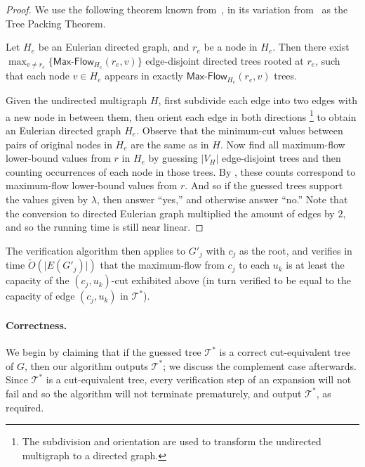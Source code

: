 \documentclass{toc}
\theoremstyle{plain}
\newcommand{\ProblemName}[1]{\textsf{#1}}
\newcommand{\MF}{\ProblemName{Max-Flow}\xspace}
\newcommand\tO{\ensuremath{\widetilde O}}  %
\newcommand{\TG}{\mathcal{T}^*}
\providecommand{\card}[1]{\lvert#1\rvert}
\begin{document}
\begin{proof}
We use the following theorem known from~\cite[Theorem $2.7$]{Bang-Jensen95},
in its variation from~\cite{Cole03} as the Tree Packing Theorem.

\begin{theorem}\label{theorem:BHKP}
Let $H_e$ be an Eulerian directed graph, and $r_e$ be a node in $H_e$.
Then there exist $\max_{v\neq r_e}\{\MF_{H_e}(r_e,v)\}$ edge-disjoint directed trees rooted at $r_e$, such that each node $v\in H_e$ appears in exactly $\MF_{H_e}(r_e,v)$ trees.
\end{theorem}

Given the undirected multigraph $H$, first subdivide each edge into two edges with a new node in between them,
then orient each edge in both directions%
\footnote{The subdivision and orientation are used to transform
  the undirected multigraph to a directed graph.
}
to obtain an Eulerian directed graph $H_e$.
Observe that the minimum-cut values between pairs of original nodes in $H_e$ are the same as in $H$.
%
Now find all maximum-flow lower-bound values from $r$
in $H_e$ by guessing $\card{V_H}$ edge-disjoint trees and then counting occurrences of each node in those trees. By , these counts correspond to maximum-flow lower-bound values from $r$. And so if the guessed trees support the values given by $\lambda$, then answer ``yes,'' and otherwise answer ``no.'' Note that the conversion to directed Eulerian graph multiplied the amount of edges by $2$, and so the running time is still near linear.
\end{proof}


The verification algorithm then applies 
to $G'_j$ with $c_j$ as the root, and verifies in time $\tO(\card{E(G'_j)})$
that the maximum-flow from $c_j$ to each $u_k$
is at least the capacity of the $(c_j,u_k)$-cut exhibited above
(in turn verified to be equal to the capacity of edge $(c_j, u_k)$ in $\TG$).


\paragraph{Correctness.}

We begin by claiming that if the guessed tree $\TG$ is a correct cut-equivalent tree of $G$, then our algorithm outputs $\TG$; we discuss the complement case afterwards.
Since $\TG$ is a cut-equivalent tree, every verification step of an expansion will not fail and so the algorithm will not terminate prematurely, and output $\TG$, as required.
\end{document}
